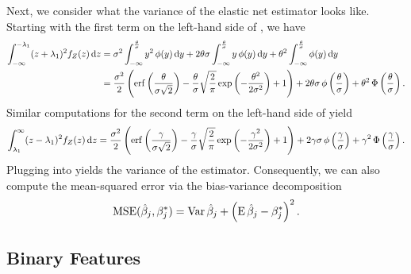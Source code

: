 Next, we consider what the variance of the elastic net estimator looks like.
Starting with the first term on the left-hand side of , we have
\begin{align}
  \label{eq:mc-var-part1}
  \int_{-\infty}^{-\lambda_1}(z+ \lambda_1)^2 f_Z(z) \mathop{}\!\mathrm{d} z & = \sigma^2 \int_{-\infty}^{\frac{\theta}{\sigma}} y^2 \operatorname{\phi}(y) \mathop{}\!\mathrm{d} y + 2 \theta \sigma \int_{-\infty}^{\frac{\theta}{\sigma}} y \operatorname{\phi}(y) \mathop{}\!\mathrm{d} y + \theta^2 \int_{-\infty}^{\frac{\theta}{\sigma}} \operatorname{\phi}(y) \mathop{}\!\mathrm{d} y                                                                               \nonumber \\
                                                           & = \frac{\sigma^2}{2} \left( \operatorname{erf}\left(\frac{\theta}{\sigma\sqrt{2}}\right) - \frac{\theta}{\sigma}\sqrt{\frac{2}{\pi}} \exp\left(-\frac{\theta^2}{2\sigma^2}\right) + 1 \right) + 2 \theta \sigma \operatorname{\phi} \left(\frac{\theta}{\sigma}\right) + \theta^2 \operatorname{\Phi}\left(\frac{\theta}{\sigma}\right).
\end{align}
Similar computations for the second term on the left-hand side of  yield
\begin{equation}
  \label{eq:mc-var-part2}
  \int_{\lambda_1}^{\infty}(z - \lambda_1)^2 f_Z(z) \mathop{}\!\mathrm{d} z = \frac{\sigma^2}{2} \left( \operatorname{erf}\left(\frac{\gamma}{\sigma\sqrt{2}}\right) - \frac{\gamma}{\sigma}\sqrt{\frac{2}{\pi}} \exp\left(-\frac{\gamma^2}{2\sigma^2}\right) + 1 \right) + 2 \gamma \sigma \operatorname{\phi} \left(\frac{\gamma}{\sigma}\right) + \gamma^2 \operatorname{\Phi}\left(\frac{\gamma}{\sigma}\right).
\end{equation}
Plugging  into  yields the variance of the estimator. Consequently, we can also compute the mean-squared error via the bias-variance decomposition
\begin{equation*}
  \label{eq:betahat-mse}
  \operatorname{MSE} (\hat\beta_j, \beta^*_j) = \operatorname{Var}\hat\beta_j + \left(\operatorname{E} \hat\beta_j - \beta^*_j\right)^2.
\end{equation*}

\subsection{Binary Features}\label{sec:theory-binary-features}

